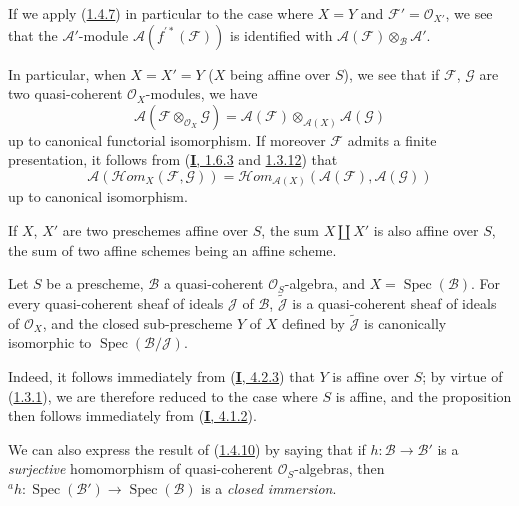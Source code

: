If we apply (\hyperref[II.1.4.7]{1.4.7}) in particular to the case where
$X=Y$ and $\mathcal{F}'=\mathcal{O}_{X'}$, we see that the
$\mathcal{A}'$-module $\mathcal{A}(f^{\prime*}(\mathcal{F}))$ is identified
with $\mathcal{A}(\mathcal{F})\otimes_{\mathcal{B}}\mathcal{A}'$.

\begin{env}[1.4.8]
\label{II.1.4.8}
In particular, when $X=X'=Y$ ($X$ being affine over $S$), we see
that if $\mathcal{F}$, $\mathcal{G}$ are two quasi-coherent
$\mathcal{O}_X$-modules, we have
\[
  \mathcal{A}(\mathcal{F}\otimes_{\mathcal{O}_X}\mathcal{G})
  =\mathcal{A}(\mathcal{F})\otimes_{\mathcal{A}(X)}\mathcal{A}(\mathcal{G})
  \tag{1.4.8.1}\label{II.1.4.8.1}
\]
up to canonical functorial isomorphism. If moreover $\mathcal{F}$ admits
a finite presentation, it follows from
(\hyperref[I.1.6.3]{\textbf{I}, 1.6.3} and
\hyperref[I.1.3.12]{1.3.12}) that
\[
  \mathcal{A}(\mathcal{H}om_X(\mathcal{F},\mathcal{G}))
  =\mathcal{H}om_{\mathcal{A}(X)}
    (\mathcal{A}(\mathcal{F}),\mathcal{A}(\mathcal{G}))
  \tag{1.4.8.2}\label{II.1.4.8.2}
\]
up to canonical isomorphism.
\end{env}

\begin{remark}[1.4.9]
\label{II.1.4.9}
If $X$, $X'$ are two preschemes affine over $S$, the sum
$X\amalg X'$ is also affine over $S$, the sum of two affine schemes
being an affine scheme.
\end{remark}

\begin{proposition}[1.4.10]
\label{II.1.4.10}
Let $S$ be a prescheme, $\mathcal{B}$ a quasi-coherent
$\mathcal{O}_S$-algebra, and $X=\operatorname{Spec}(\mathcal{B})$. For every
quasi-coherent sheaf of ideals $\mathcal{J}$ of $\mathcal{B}$,
$\widetilde{\mathcal{J}}$ is a quasi-coherent sheaf of ideals of
$\mathcal{O}_X$, and the closed sub-prescheme $Y$ of $X$ defined by
$\widetilde{\mathcal{J}}$ is canonically isomorphic to
$\operatorname{Spec}(\mathcal{B}/\mathcal{J})$.
\end{proposition}

Indeed, it follows immediately from (\hyperref[I.4.2.3]{\textbf{I}, 4.2.3}) that
$Y$ is affine over $S$; by virtue of
(\hyperref[II.1.3.1]{1.3.1}), we are therefore reduced to the case where
$S$ is affine, and the proposition then follows immediately from
(\hyperref[I.4.1.2]{\textbf{I}, 4.1.2}).

We can also express the result of
(\hyperref[II.1.4.10]{1.4.10}) by saying that if
$h:\mathcal{B}\to\mathcal{B}'$ is a \emph{surjective} homomorphism of
quasi-coherent $\mathcal{O}_S$-algebras, then
${}^a h:\operatorname{Spec}(\mathcal{B}')\to
\operatorname{Spec}(\mathcal{B})$ is a \emph{closed immersion}.

